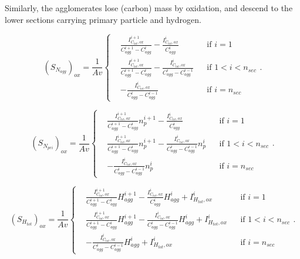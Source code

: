 Similarly, the agglomerates lose (carbon) mass by oxidation, and descend to the lower sections carrying primary particle and hydrogen.

\begin{equation}
	\left(S_{N_{agg}}\right)_{ox}=
	\frac{1}{Av}
	\left\{
	\begin{aligned}
		&\frac{I^{i+1}_{C_{tot},ox}}{C^{i+1}_{agg}-C^{i}_{agg}}
		-
		\frac{I^{i}_{C_{tot},ox}}{C^{i}_{agg}}
		&&
		\text{if } i = 1
		\\
		&\frac{I^{i+1}_{C_{tot},ox}}{C^{i+1}_{agg}-C^{i}_{agg}}
		-
		\frac{I^{i}_{C_{tot},ox}}{C^{i}_{agg}-C^{i-1}_{agg}}
		&&
		\text{if } 1 < i < n_{sec}
		\\
		&
		-
		\frac{I^{i}_{C_{tot},ox}}{C^{i}_{agg}-C^{i-1}_{agg}}
		&&\text{if } i=n_{sec}
	\end{aligned}
	\right.
	\label{eqn:S_Nagg_oxsect}.
\end{equation}

\begin{equation}
	\left(S_{N_{pri}}\right)_{ox}=
	\frac{1}{Av}
	\left\{
	\begin{aligned}
		&\frac{I^{i+1}_{C_{tot},ox}}{C^{i+1}_{agg}-C^{i}_{agg}}n^{i+1}_p
		-
		\frac{I^{i}_{C_{tot},ox}}{C^{i}_{agg}}
		&&
		\text{if } i = 1
		\\
		&\frac{I^{i+1}_{C_{tot},ox}}{C^{i+1}_{agg}-C^{i}_{agg}}n^{i+1}_p
		-
		\frac{I^{i}_{C_{tot},ox}}{C^{i}_{agg}-C^{i-1}_{agg}}n^{i}_p
		&&
		\text{if } 1 < i < n_{sec}
		\\
		&
		-
		\frac{I^{i}_{C_{tot},ox}}{C^{i}_{agg}-C^{i-1}_{agg}}n^{i}_p
		&&\text{if } i=n_{sec}
	\end{aligned}
	\right.
	\label{eqn:S_Npri_oxsect}.
\end{equation}

\begin{equation}
	\left(S_{H_{tot}}\right)_{ox}=
	\frac{1}{Av}
	\left\{
	\begin{aligned}
		&\frac{I^{i+1}_{C_{tot},ox}}{C^{i+1}_{agg}-C^{i}_{agg}}H^{i+1}_{agg}
		-
		\frac{I^{i}_{C_{tot},ox}}{C^{i}_{agg}}H^{i}_{agg}
		+ I^{i}_{H_{tot}, ox}
		&&
		\text{if } i = 1
		\\
		&\frac{I^{i+1}_{C_{tot},ox}}{C^{i+1}_{agg}-C^{i}_{agg}}H^{i+1}_{agg}
		-
		\frac{I^{i}_{C_{tot},ox}}{C^{i}_{agg}-C^{i-1}_{agg}}H^{i}_{agg}
		+ I^{i}_{H_{tot}, ox}
		&&
		\text{if } 1 < i < n_{sec}
		\\
		&
		-
		\frac{I^{i}_{C_{tot},ox}}{C^{i}_{agg}-C^{i-1}_{agg}}H^{i}_{agg}
		+ I^{i}_{H_{tot}, ox}
		&&\text{if } i=n_{sec}
	\end{aligned}
	\right.
	\label{eqn:S_Htot_oxsect}.
\end{equation}

